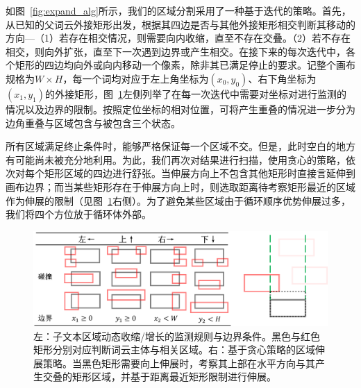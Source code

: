 如图~\ref{fig:expand_alg}所示，我们的区域分割采用了一种基于迭代的策略。首先，从已知的父词云外接矩形出发，根据其四边是否与其他外接矩形相交判断其移动的方向---（1）若存在相交情况，则需要向内收缩，直至不存在交叠。（2）若不存在相交，则向外扩张，直至下一次遇到边界或产生相交。在接下来的每次迭代中，各个矩形的四边均向外或向内移动一个像素，除非其已满足停止的要求。记整个画布规格为$W\times H$，每一个词均对应于左上角坐标为$(x_0, y_0)$、右下角坐标为$(x_1, y_1)$的外接矩形，图~\ref{fig:collide_rule}左侧列举了在每一次迭代中需要对坐标对进行监测的情况以及边界的限制。按照定位坐标的相对位置，可将产生重叠的情况进一步分为边角重叠与区域包含与被包含三个状态。

所有区域满足终止条件时，能够严格保证每一个区域不交。但是，此时空白的地方有可能尚未被充分地利用。为此，我们再次对结果进行扫描，使用贪心的策略，依次对每个矩形区域的四边进行舒张。当伸展方向上不包含其他矩形时直接言延伸到画布边界；而当某些矩形存在于伸展方向上时，则选取距离待考察矩形最近的区域作为伸展的限制（见图~\ref{fig:collide_rule}右侧）。为了避免某些区域由于循环顺序优势伸展过多，我们将四个方位放于循环体外部。

\begin{figure}[htbp]
	\centering
	\includegraphics[width=\textwidth]{figures/collide_rule.png}
	\caption{左：子文本区域动态收缩/增长的监测规则与边界条件。黑色与红色矩形分别对应判断词云主体与相关区域。右：基于贪心策略的区域伸展策略。当黑色矩形需要向上伸展时，考察其上部在水平方向与其产生交叠的矩形区域，并基于距离最近矩形限制进行伸展。}
	\label{fig:collide_rule}
\end{figure}

